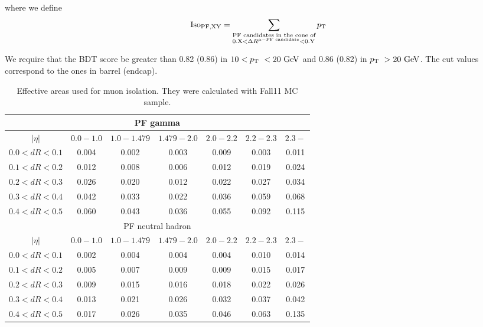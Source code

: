 where we define 
\begin{eqnarray} 
\textrm{Iso}_\textrm{PF,XY} 
= 
\sum_{
\begin{subarray}{l}
\textrm{PF candidates in the cone of} \\
\textrm{0.X}   < \Delta R^{\mu-\textrm{PF candidate}} < \textrm{0.Y} 
    \end{subarray} }
p_\mathrm{T}
\end{eqnarray} 

We require that the BDT score be greater than 0.82 (0.86) in $10<p_\mathrm{T}~<20~\mathrm{Ge\kern -0.1em V}$ 
and 0.86 (0.82) in $p_\mathrm{T}~>20~\mathrm{Ge\kern -0.1em V}$. The cut values correspond to the ones in barrel (endcap).

\begin{table}[htp]
	\centering
		\begin{tabular}{c|c|c|c|c|c|c}
			\hline 
				\multicolumn{7}{c}{PF gamma} \\
	  	    \hline
			 	$|\eta|$     & $0.0 - 1.0$ & $1.0 - 1.479$ & $1.479 - 2.0$ & $2.0 - 2.2$ & $2.2 - 2.3$ & $2.3-$ \\       		
	  	    \hline \hline
				$0.0<dR<0.1$ & 0.004& 0.002& 0.003& 0.009& 0.003& 0.011 \\
				$0.1<dR<0.2$ & 0.012& 0.008& 0.006& 0.012& 0.019& 0.024 \\
				$0.2<dR<0.3$ & 0.026& 0.020& 0.012& 0.022& 0.027& 0.034 \\
				$0.3<dR<0.4$ & 0.042& 0.033& 0.022& 0.036& 0.059& 0.068 \\
				$0.4<dR<0.5$ & 0.060& 0.043& 0.036& 0.055& 0.092& 0.115 \\
	  	    \hline \hline 
				\multicolumn{7}{c}{PF neutral hadron} \\
	  	    \hline 
			 	$|\eta|$     & $0.0 - 1.0$ & $1.0 - 1.479$ & $1.479 - 2.0$ & $2.0 - 2.2$ & $2.2 - 2.3$ & $2.3-$ \\       		
	  	    \hline \hline
				$0.0<dR<0.1$ & 0.002& 0.004& 0.004& 0.004& 0.010& 0.014 \\
			    $0.1<dR<0.2$ & 0.005& 0.007& 0.009& 0.009& 0.015& 0.017 \\
			    $0.2<dR<0.3$ & 0.009& 0.015& 0.016& 0.018& 0.022& 0.026 \\ 
				$0.3<dR<0.4$ & 0.013& 0.021& 0.026& 0.032& 0.037& 0.042 \\ 
				$0.4<dR<0.5$ & 0.017& 0.026& 0.035& 0.046& 0.063& 0.135 \\ 
			\hline
		\end{tabular}
		\caption{ Effective areas used for muon isolation. They were calculated with Fall11 MC sample.}
	\label{tab:muAeff}
\end{table}

